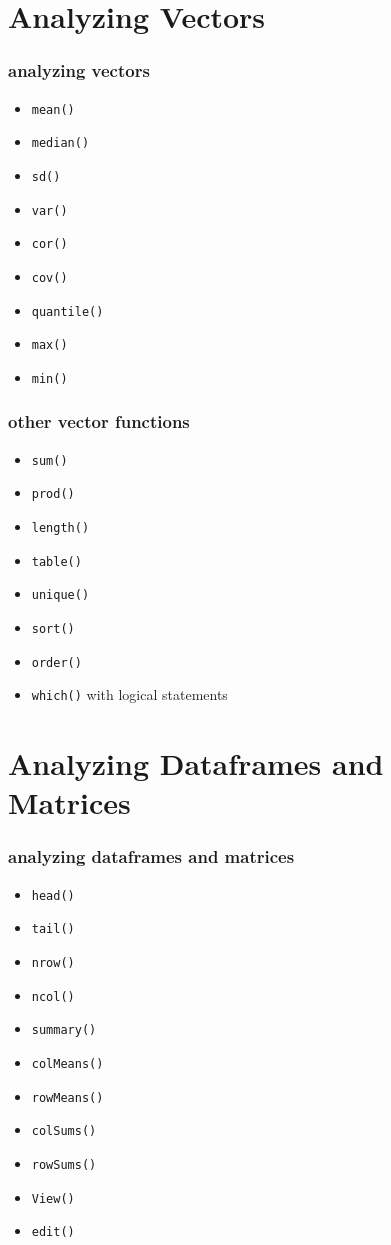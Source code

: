 \documentclass[handout]{beamer}
\newcommand{\red}{\color{red}}
\newcommand{\black}{\color{black}}
\begin{document}
\section{Analyzing Vectors}
\begin{frame}
\frametitle{analyzing vectors}
\pause
\begin{itemize}
\red
\item {\tt mean()}
\item {\tt median()}
\item {\tt sd()}
\item {\tt var()}
\item {\tt cor()}
\item {\tt cov()}
\item {\tt quantile()}
\item {\tt max()}
\item {\tt min()}
\end{itemize}
\end{frame}

\begin{frame}
\frametitle{other vector functions}
\pause
\begin{itemize}
\red
\item {\tt sum()}
\item {\tt prod()}
\item {\tt length()}
\item {\tt table()}
\item {\tt unique()}
\item {\tt sort()}
\item {\tt order()}
\item {\tt which()} \black with logical statements
\end{itemize}
\end{frame}

\section{Analyzing Dataframes and Matrices}
\begin{frame}
\frametitle{analyzing dataframes and matrices}
\pause
\begin{itemize}
\red
\item {\tt head()}
\item {\tt tail()}
\item {\tt nrow()}
\item {\tt ncol()}
\item {\tt summary()}
\item {\tt colMeans()}
\item {\tt rowMeans()}
\item {\tt colSums()}
\item {\tt rowSums()}
\item {\tt View()}
\item {\tt edit()}
\end{itemize}
\end{frame}
\end{document}
